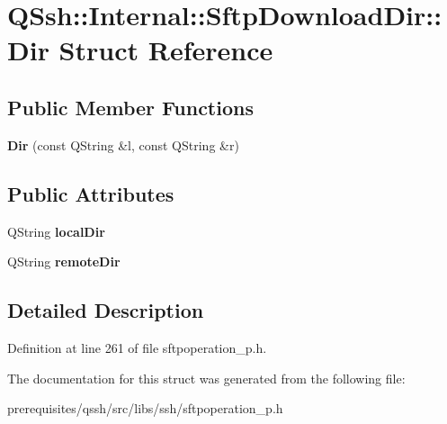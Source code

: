 \hypertarget{struct_q_ssh_1_1_internal_1_1_sftp_download_dir_1_1_dir}{}\section{Q\+Ssh\+:\+:Internal\+:\+:Sftp\+Download\+Dir\+:\+:Dir Struct Reference}
\label{struct_q_ssh_1_1_internal_1_1_sftp_download_dir_1_1_dir}
\subsection*{Public Member Functions}
\begin{DoxyCompactItemize}
\item 
\mbox{\label{struct_q_ssh_1_1_internal_1_1_sftp_download_dir_1_1_dir_a21a48e411474c945023a523d6b759161}} 
{\bfseries Dir} (const Q\+String \&l, const Q\+String \&r)
\end{DoxyCompactItemize}
\subsection*{Public Attributes}
\begin{DoxyCompactItemize}
\item 
\mbox{\label{struct_q_ssh_1_1_internal_1_1_sftp_download_dir_1_1_dir_aad3a842d0e3cda5c04b3ab1da19392b9}} 
Q\+String {\bfseries local\+Dir}
\item 
\mbox{\label{struct_q_ssh_1_1_internal_1_1_sftp_download_dir_1_1_dir_a055b20d0608df163f084ff615f5ea81e}} 
Q\+String {\bfseries remote\+Dir}
\end{DoxyCompactItemize}


\subsection{Detailed Description}


Definition at line 261 of file sftpoperation\+\_\+p.\+h.



The documentation for this struct was generated from the following file\+:\begin{DoxyCompactItemize}
\item 
prerequisites/qssh/src/libs/ssh/sftpoperation\+\_\+p.\+h\end{DoxyCompactItemize}
